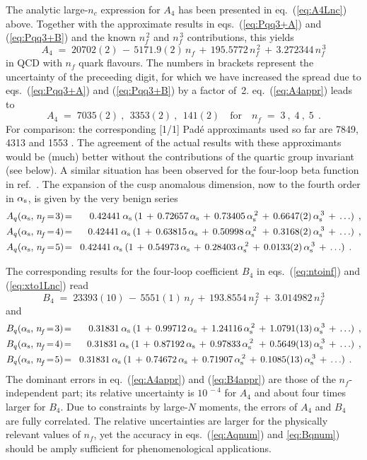 \documentclass[12pt]{article}
\newcommand{\beq}{\begin{equation}}
\newcommand{\eeq}{\end{equation}}
\newcommand{\bea}{\begin{eqnarray}}
\newcommand{\eea}{\end{eqnarray}}
\newcommand{\nn}{\nonumber}
\newcommand{\als}{\alpha_{\rm s}}
\def\as(#1){{\alpha_{\rm s}^{\,#1}}}
\def\nc{{n_c}}
\def\nf{{n^{}_{\! f}}}
\def\nfs{{n^{\,2}_{\! f}}}
\def\nft{{n^{\,3}_{\! f}}}
\begin{document}
The analytic large-$\nc$ expression for $A_4$ has been presented in 
eq.~(\ref{eq:A4Lnc}) above. Together with the approximate results
in eqs.~(\ref{eq:Pqq3+A}) and (\ref{eq:Pqq3+B}) and the known $\nfs$ 
and $\nft$ contributions, this yields
%
\beq
\label{eq:A4appr}
   A_4 \;=\;      20702(2)       \,-\, 5171.9(2) \,\nf 
             \,+\,195.5772\,\nfs \,+\, 3.272344 \,\nft
\eeq
%
in QCD with $\nf$ quark flavours. The numbers in brackets represent the 
uncertainty of the preceeding digit, for which we have increased the spread 
due to eqs.~(\ref{eq:Pqq3+A}) and (\ref{eq:Pqq3+B}) by a factor of~2. 
eq.~(\ref{eq:A4appr}) leads to
%
\beq
\label{eq:A4nf345}
  A_4 \;=\; 7035(2) \: ,\:\: 3353(2) \: ,\:\: 141(2)
  \quad \mbox{for} \quad \nf \; = \; 3\: ,\; 4\: ,\; 5 \:\: .
\eeq
%
For comparison: the corresponding [1/1] Pad\'e approximants used so far are
7849, 4313 and 1553 \cite{Moch:2005ba}. 
The agreement of the actual results with these approximants would be (much) 
better without the contributions of the quartic group invariant (see below).
A similar situation has been observed for the four-loop beta function in 
ref.~\cite{vanRitbergen:1997va}. The expansion of the cusp anomalous dimension,
now to the fourth order in $\als$, is given by the very benign series
%
\bea
\label{eq:Aqnum}
  A_q(\als,\,\nf\!=\!3) &\!=\!& 0.42441\:\als \:
  ( 1 \, + \, 0.72657\, \als \, + \, 0.73405\, \as(2) \,+\, 0.6647(2)\, \as(3)
  \, + \, \ldots )
\:\: , \nn \\
  A_q(\als,\,\nf\!=\!4) &\!=\!& 0.42441\:\als \:
  ( 1 \, + \, 0.63815\, \als \, + \, 0.50998\, \as(2) \ +\, 0.3168(2)\, \as(3)
  \, + \, \ldots )
\:\: ,\nn \\
  A_q(\als,\,\nf\!=\!5) &\!=\!& 0.42441\:\als \:
  ( 1 \, + \, 0.54973\, \als \, + \, 0.28403\, \as(2) \,+\, 0.0133(2)\, \as(3)
  \, + \, \ldots )
\:\: . \quad
\eea

The corresponding results for the four-loop coefficient $B_4$ in 
eqs.~(\ref{eq:ntoinf}) and (\ref{eq:xto1Lnc}) read
%
\beq
\label{eq:B4appr}
   B_4 \;=\;      23393(10)      \,-\, 5551(1) \,\nf
            \,+\, 193.8554\,\nfs \,+\, 3.014982\,\nft
\eeq
%
and
%
\bea
\label{eq:Bqnum}
  B_q(\als,\,\nf\!=\!3) &\!=\!& 0.31831\:\als \:
  ( 1 \, + \, 0.99712\, \als \, + \, 1.24116\, \as(2) \,+\, 1.0791(13)\, \as(3)
  \, + \, \ldots )
\:\: , \nn \\
  B_q(\als,\,\nf\!=\!4) &\!=\!& 0.31831\:\als \:
  ( 1 \, + \, 0.87192\, \als \, + \, 0.97833\, \as(2) \ +\, 0.5649(13)\, \as(3)
  \, + \, \ldots )
\:\: ,\nn \\
  B_q(\als,\,\nf\!=\!5) &\!=\!& 0.31831\:\als \:
  ( 1 \, + \, 0.74672\, \als \, + \, 0.71907\, \as(2) \,+\, 0.1085(13)\, \as(3)
  \, + \, \ldots )
\:\: . \quad
\eea
%
The dominant errors in eq.~(\ref{eq:A4appr}) and (\ref{eq:B4appr}) are those 
of the $\nf$-independent part; its relative uncertainty is $10^{\,-4}$ for
$A_4$ and about four times larger for $B_4$. Due to constraints by large-$N$ 
moments, the errors of $A_4$ and $B_4$ are fully correlated. The relative
uncertainties are larger for the physically relevant values of $\nf$, yet 
the accuracy in eqs.~(\ref{eq:Aqnum}) and \ref{eq:Bqnum}) should be amply
sufficient for phenomenological applications. 
\end{document}

